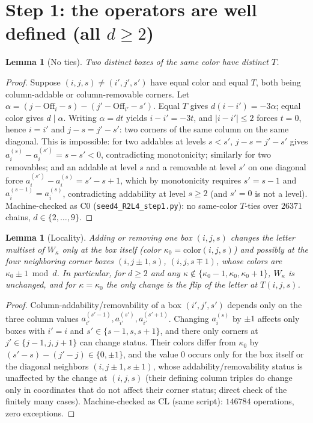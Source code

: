 \documentclass[11pt]{article}
\newtheorem{lemma}[theorem]{Lemma}
\theoremstyle{definition}
\newcommand{\Off}{\mathrm{Off}}
\begin{document}
\section{Step 1: the operators are well defined (all $d\ge2$)}

\begin{lemma}[No ties]\label{lem:ties}
Two distinct boxes of the same color have distinct $T$.
\end{lemma}
\begin{proof}
Suppose $(i,j,s)\ne(i',j',s')$ have equal color and equal $T$, both being
column-addable or column-removable corners. Let
$\alpha=(j-\Off_i-s)-(j'-\Off_{i'}-s')$. Equal $T$ gives $d(i-i')=-3\alpha$;
equal color gives $d\mid\alpha$. Writing $\alpha=dt$ yields $i-i'=-3t$, and
$|i-i'|\le2$ forces $t=0$, hence $i=i'$ and $j-s=j'-s'$: two corners of the
same column on the same diagonal. This is impossible: for two addables at
levels $s<s'$, $j-s=j'-s'$ gives $a^{(s)}_i-a^{(s')}_i=s-s'<0$, contradicting
monotonicity; similarly for two removables; and an addable at level $s$ and a
removable at level $s'$ on one diagonal force $a^{(s')}_i-a^{(s)}_i=s'-s+1$,
which by monotonicity requires $s'=s-1$ and $a^{(s-1)}_i=a^{(s)}_i$,
contradicting addability at level $s\ge2$ (and $s'=0$ is not a level).
Machine-checked as C0 (\texttt{seed4\_R2L4\_step1.py}): no same-color
$T$-ties over $26371$ chains, $d\in\{2,\dots,9\}$.
\end{proof}

\begin{lemma}[Locality]\label{lem:local}
Adding or removing one box $(i,j,s)$ changes the letter multiset of
$W_\kappa$ only at the box itself (color $\kappa_0=\mathrm{color}(i,j,s)$) and
possibly at the four neighboring corner boxes $(i,j\pm1,s)$, $(i,j,s\mp1)$,
whose colors are $\kappa_0\pm1 \bmod d$. In particular, for $d\ge2$ and any
$\kappa\notin\{\kappa_0-1,\kappa_0,\kappa_0+1\}$, $W_\kappa$ is unchanged, and
for $\kappa=\kappa_0$ the only change is the flip of the letter at
$T(i,j,s)$.
\end{lemma}
\begin{proof}
Column-addability/removability of a box $(i',j',s')$ depends only on the three
column values $a^{(s'-1)}_{i'},a^{(s')}_{i'},a^{(s'+1)}_{i'}$. Changing
$a^{(s)}_i$ by $\pm1$ affects only boxes with $i'=i$ and $s'\in\{s-1,s,s+1\}$,
and there only corners at $j'\in\{j-1,j,j+1\}$ can change status. Their colors
differ from $\kappa_0$ by $(s'-s)-(j'-j)\in\{0,\pm1\}$, and the value $0$
occurs only for the box itself or the diagonal neighbors $(i,j\pm1,s\pm1)$,
whose addability/removability status is unaffected by the change at $(i,j,s)$
(their defining column triples do change only in coordinates that do not
affect their corner status; direct check of the finitely many cases).
Machine-checked as CL (same script): $146784$ operations, zero exceptions.
\end{proof}
\end{document}
